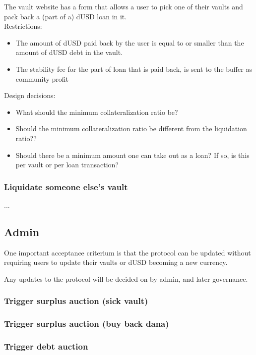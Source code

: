 \documentclass{article} %
\begin{document}
The vault website has a form that allows a user to pick one of their vaults and
pack back a (part of a) dUSD loan in it. \\

Restrictions:
\begin{itemize}
  \item The amount of dUSD paid back by the user is equal to or smaller than the
    amount of dUSD debt in the vault.
  \item The stability fee for the part of loan that is paid back, is sent to the
    buffer as community profit
\end{itemize}

Design decisions:
\begin{itemize}
  \item What should the minimum collateralization ratio be?
  \item Should the minimum collateralization ratio be different from the
    liquidation ratio??
  \item Should there be a minimum amount one can take out as a loan? If so, is
    this per vault or per loan transaction?
\end{itemize}

\subsubsection{Liquidate someone else's vault}

...

\subsection{Admin}

One important acceptance criterium is that the protocol can be updated without
requiring users to update their vaults or dUSD becoming a new currency.

Any updates to the protocol will be decided on by admin, and later governance.

\subsubsection{Trigger surplus auction (sick vault)}

\subsubsection{Trigger surplus auction (buy back dana)}

\subsubsection{Trigger debt auction}
\end{document}
